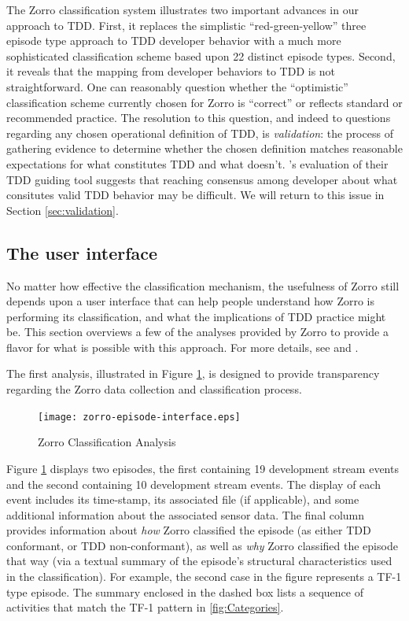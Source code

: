 \documentclass[smallextended]{svjour3}     %
\begin{document}
The Zorro classification system illustrates two important advances in our
approach to TDD.  First, it replaces the simplistic ``red-green-yellow''
three episode type approach to TDD developer behavior with a much more
sophisticated classification scheme based upon 22 distinct episode
types. Second, it reveals that the mapping from developer behaviors to TDD
is not straightforward. One can reasonably question whether the
``optimistic'' classification scheme currently chosen for Zorro is ``correct'' or 
reflects
standard or recommended practice.  
The resolution to this question, and indeed to questions regarding any
chosen operational definition of TDD, is {\em validation}: the process of
gathering evidence to determine whether the chosen definition matches
reasonable expectations for what constitutes TDD and what doesn't. \citep{Mishali:08}'s 
evaluation of their TDD guiding tool  
suggests that reaching consensus among developer about what consitutes valid
TDD behavior may be difficult. 
We will return to this issue in Section \ref{sec:validation}.

\subsection{The user interface}

No matter how effective the classification mechanism, the usefulness of Zorro still depends upon a user interface that can help people understand how Zorro is performing its classification, and what the implications of TDD practice might be. 
This section overviews a few of the
analyses provided by Zorro to provide a flavor for what is possible with
this approach. For more details, see \cite{csdl2-07-04} and \cite{Wang:04}.

The first analysis, illustrated in Figure \ref{fig:Analysis-Table}, is
designed to provide transparency regarding the Zorro data collection and
classification process.

\begin{figure}[th]
  \center
  \texttt{[image: zorro-episode-interface.eps]}
  \caption{Zorro Classification Analysis}
  \label{fig:Analysis-Table}
\end{figure} 

Figure \ref{fig:Analysis-Table} displays two episodes, the first containing
19 development stream events and the second containing 10 development
stream events.  The display of each event includes its time-stamp, its
associated file (if applicable), and some additional information about the
associated sensor data.  The final column provides information about {\em
how} Zorro classified the episode (as either TDD conformant, or TDD
non-conformant), as well as {\em why} Zorro classified the episode that way
(via a textual summary of the episode's structural characteristics used in
the classification).  For example, the second case in the figure represents a TF-1 type episode. The summary enclosed in 
the dashed box lists a sequence of activities that match the TF-1 pattern in \ref{fig:Categories}.
\end{document}
